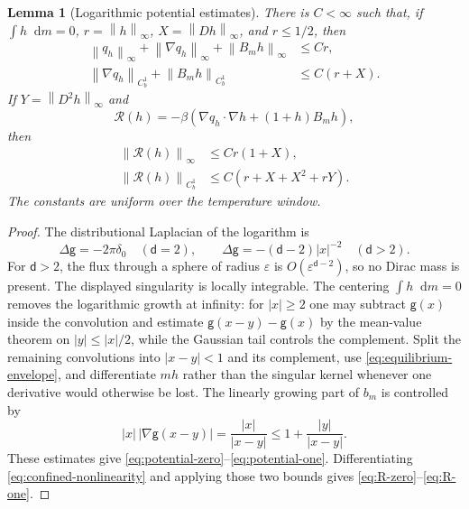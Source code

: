 \documentclass[11pt,reqno]{amsart}
\numberwithin{equation}{section}
\newtheorem{lemma}[lemma]{Lemma}
\theoremstyle{definition}
\theoremstyle{remark}
\newcommand{\g}{\mathsf g}
\renewcommand{\d}{\mathsf d}
\newcommand{\dd}{\mathop{}\!\mathrm d}
\newcommand{\norm}[1]{\left\lVert#1\right\rVert}
\begin{document}
\begin{lemma}[Logarithmic potential estimates]\label{lem:confined-potential}
There is $C<\infty$ such that, if $\int h\dd m=0$, $r=\norm h_\infty$, $X=\norm{Dh}_\infty$, and $r\leq1/2$, then
\begin{align}
 \norm{q_h}_\infty+\norm{\nabla q_h}_\infty+\norm{B_mh}_\infty&\leq Cr,
 \label{eq:potential-zero}\\
 \norm{\nabla q_h}_{C_b^1}+\norm{B_mh}_{C_b^1}&\leq C(r+X).
 \label{eq:potential-one}
\end{align}
If $Y=\norm{D^2h}_\infty$ and
\begin{equation}\label{eq:confined-nonlinearity}
 \mathcal R(h)=-\beta\left(\nabla q_h\cdot\nabla h+(1+h)B_mh\right),
\end{equation}
then
\begin{align}
 \norm{\mathcal R(h)}_\infty&\leq Cr(1+X),
 \label{eq:R-zero}\\
 \norm{\mathcal R(h)}_{C_b^1}&\leq C(r+X+X^2+rY).
 \label{eq:R-one}
\end{align}
The constants are uniform over the temperature window.
\end{lemma}
\begin{proof}
The distributional Laplacian of the logarithm is
\begin{equation}\label{eq:laplacian-log-dimension}
 \Delta\g=-2\pi\delta_0\quad(\d=2),
 \qquad
 \Delta\g=-(\d-2)|x|^{-2}\quad(\d>2).
\end{equation}
For $\d>2$, the flux through a sphere of radius $\varepsilon$ is $O(\varepsilon^{\d-2})$, so no Dirac mass is present. The displayed singularity is locally integrable. The centering $\int h\dd m=0$ removes the logarithmic growth at infinity: for $|x|\geq2$ one may subtract $\g(x)$ inside the convolution and estimate $\g(x-y)-\g(x)$ by the mean-value theorem on $|y|\leq|x|/2$, while the Gaussian tail controls the complement. Split the remaining convolutions into $|x-y|<1$ and its complement, use \eqref{eq:equilibrium-envelope}, and differentiate $mh$ rather than the singular kernel whenever one derivative would otherwise be lost. The linearly growing part of $b_m$ is controlled by
\begin{equation}\label{eq:x-over-distance}
 |x|\,|\nabla\g(x-y)|=\frac{|x|}{|x-y|}
 \leq1+\frac{|y|}{|x-y|}.
\end{equation}
These estimates give \eqref{eq:potential-zero}--\eqref{eq:potential-one}. Differentiating \eqref{eq:confined-nonlinearity} and applying those two bounds gives \eqref{eq:R-zero}--\eqref{eq:R-one}.
\end{proof}
\end{document}
